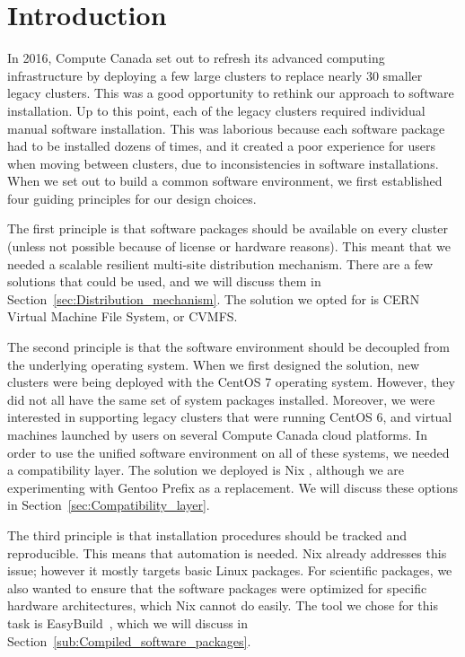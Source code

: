 \documentclass[sigconf]{acmart}
\begin{document}
%
\maketitle

\section{Introduction}
\label{sec:Introduction}
In 2016, Compute Canada set out to refresh its advanced computing infrastructure by deploying a few large clusters to replace nearly 30 smaller legacy clusters. This was a good opportunity to rethink our approach to software installation. Up to this point, each of the legacy clusters required individual manual software installation. This was laborious because each software package had to be installed dozens of times, and it created a poor experience for users when moving between clusters, due to inconsistencies in software installations. When we set out to build a common software environment, we first established four guiding principles for our design choices.

The first principle is that software packages should be available on every cluster (unless not possible because of license or hardware reasons). This meant that we needed a scalable resilient multi-site distribution mechanism. There are a few solutions that could be used, and we will discuss them in Section~\ref{sec:Distribution_mechanism}. The solution we opted for is CERN Virtual Machine File System, or CVMFS\cite{CVMFS}.

The second principle is that the software environment should be decoupled from the underlying operating system. When we first designed the solution, new clusters were being deployed with the CentOS 7 operating system. However, they did not all have the same set of system packages installed. Moreover, we were interested in supporting legacy clusters
that were running CentOS 6, and virtual machines launched by users on several Compute Canada cloud platforms. In order to use the unified software environment on all of these systems, we needed a compatibility layer. 
The solution we deployed is Nix \cite{Nix}, although we are experimenting with Gentoo Prefix \cite{Gentoo} as a replacement. We will discuss these options in Section~\ref{sec:Compatibility_layer}.

The third principle is that installation procedures should be tracked and reproducible. This means that automation is needed. Nix already addresses this issue; however it mostly targets basic Linux packages. For scientific packages, we also wanted to ensure that the software packages were optimized for specific hardware architectures, which Nix cannot do easily. The tool we chose for this task is EasyBuild~\cite{EasyBuild2012,EasyBuild2014,EasyBuild2016}, which we will discuss in Section~\ref{sub:Compiled_software_packages}.
\end{document}
